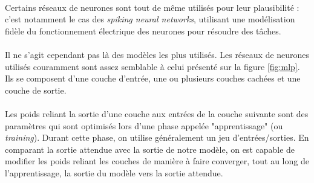 \documentclass[a4paper,10pt]{article}
\begin{document}
                \paragraph{}
                    Certains réseaux de neurones sont tout de même utilisés pour 
                    leur plausibilité : c'est notamment le cas des \textit{spiking neural networks}, 
                    utilisant une modélisation fidèle du fonctionnement électrique 
                    des neurones pour résoudre des tâches. 
                    
                \paragraph{}
                    Il ne s'agit cependant pas là des modèles les plus utilisés. 
                    Les réseaux de neurones utilisés couramment sont assez semblable
                    à celui présenté sur la figure \ref{fig:mlp}. Ils se composent 
                    d'une couche d'entrée, une ou plusieurs couches cachées et une couche de 
                    sortie. 
                    
                \paragraph{}
                    Les poids reliant la sortie d'une couche aux entrées de la couche 
                    suivante sont des paramètres qui sont optimisés lors d'une phase 
                    appelée "apprentissage" (ou \textit{training}). 
                    Durant cette phase, on utilise généralement un jeu d'entrées/sorties. 
                    En comparant la sortie attendue avec la sortie de notre modèle, on
                    est capable de modifier les poids reliant les couches de manière à 
                    faire converger, tout au long de l'apprentissage, la sortie du modèle vers 
                    la sortie attendue. 
                
\end{document}
